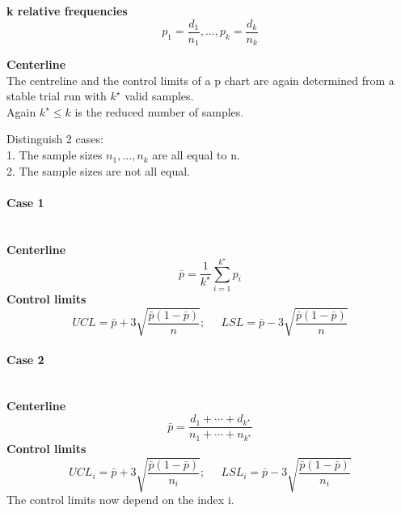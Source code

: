 \textbf{k relative frequencies}
\begin{equation}
  p_1 = \frac{d_1}{n_1},...,p_k = \frac{d_k}{n_k}
\end{equation}

\textbf{Centerline}\\
The centreline and the control limits of a p chart are again
determined from a stable trial run with $k^\star$ valid samples.\\
Again $k^\star \leq k$ is the reduced number of samples.

Distinguish 2 cases:\\
1. The sample sizes $n_1,...,n_k$ are all equal to n.\\
2. The sample sizes are not all equal.

\paragraph{Case 1}\mbox{}\\
\textbf{Centerline}
\begin{equation}
  \bar{p} = \frac{1}{k^\star} \sum^{k^\star}_{i=1}p_i
\end{equation}
\textbf{Control limits}
\begin{equation}
  UCL = \bar{p} + 3\sqrt{\frac{\bar{p}(1-\bar{p})}{n}}; \;\;\;\;\; LSL = \bar{p} - 3\sqrt{\frac{\bar{p}(1-\bar{p})}{n}}
\end{equation}

\paragraph{Case 2}\mbox{}\\
\textbf{Centerline}
\begin{equation}
  \bar{p} = \frac{d_1 + \cdots + d_{k^\star}}{n_1 + \cdots + n_{k^\star}}
\end{equation}
\textbf{Control limits}
\begin{equation}
  UCL_i = \bar{p} + 3\sqrt{\frac{\bar{p}(1-\bar{p})}{n_i}}; \;\;\;\;\; LSL_i = \bar{p} - 3\sqrt{\frac{\bar{p}(1-\bar{p})}{n_i}}
\end{equation}
The control limits now depend on the index i.

